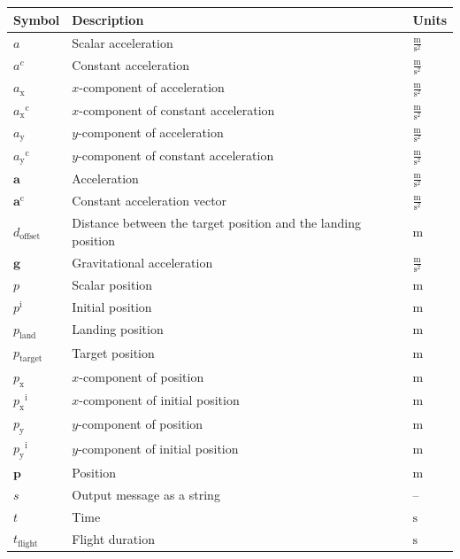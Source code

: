 \documentclass[12pt]{article}
\begin{document}
\begin{longtabu}{l X[l] l}
\toprule
\textbf{Symbol} & \textbf{Description} & \textbf{Units}
\\
\midrule
\endhead
$a$ & Scalar acceleration & $\frac{\text{m}}{\text{s}^{2}}$
\\
${a^{c}}$ & Constant acceleration & $\frac{\text{m}}{\text{s}^{2}}$
\\
${a_{\text{x}}}$ & $x$-component of acceleration & $\frac{\text{m}}{\text{s}^{2}}$
\\
${{a_{\text{x}}}^{\text{c}}}$ & $x$-component of constant acceleration & $\frac{\text{m}}{\text{s}^{2}}$
\\
${a_{\text{y}}}$ & $y$-component of acceleration & $\frac{\text{m}}{\text{s}^{2}}$
\\
${{a_{\text{y}}}^{\text{c}}}$ & $y$-component of constant acceleration & $\frac{\text{m}}{\text{s}^{2}}$
\\
$\symbf{a}$ & Acceleration & $\frac{\text{m}}{\text{s}^{2}}$
\\
${\symbf{a}^{\text{c}}}$ & Constant acceleration vector & $\frac{\text{m}}{\text{s}^{2}}$
\\
${d_{\text{offset}}}$ & Distance between the target position and the landing position & ${\text{m}}$
\\
$\symbf{g}$ & Gravitational acceleration & $\frac{\text{m}}{\text{s}^{2}}$
\\
$p$ & Scalar position & ${\text{m}}$
\\
${p^{\text{i}}}$ & Initial position & ${\text{m}}$
\\
${p_{\text{land}}}$ & Landing position & ${\text{m}}$
\\
${p_{\text{target}}}$ & Target position & ${\text{m}}$
\\
${p_{\text{x}}}$ & $x$-component of position & ${\text{m}}$
\\
${{p_{\text{x}}}^{\text{i}}}$ & $x$-component of initial position & ${\text{m}}$
\\
${p_{\text{y}}}$ & $y$-component of position & ${\text{m}}$
\\
${{p_{\text{y}}}^{\text{i}}}$ & $y$-component of initial position & ${\text{m}}$
\\
$\symbf{p}$ & Position & ${\text{m}}$
\\
$s$ & Output message as a string & --
\\
$t$ & Time & ${\text{s}}$
\\
${t_{\text{flight}}}$ & Flight duration & ${\text{s}}$
\\

\end{longtabu}
\end{document}
